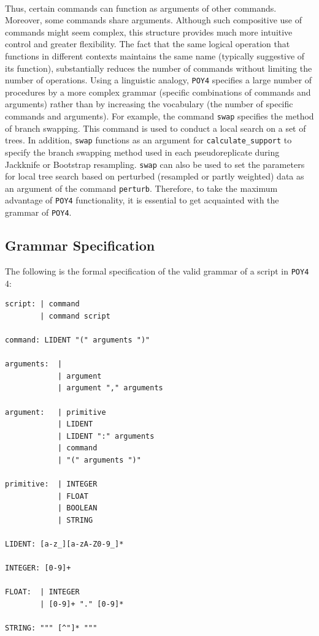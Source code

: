 \documentclass[11pt]{book}
\newcommand{\commandstyle}[1]{\texttt{#1}}
\newcommand{\poycommand}[1]{\commandstyle{#1}}
\newcommand{\poy}{\commandstyle{POY4}\xspace}
\begin{document}
\paragraph{}Thus, certain commands can function as arguments of other commands. Moreover,
some commands share arguments. Although such compositive use of commands
might seem complex, this structure provides much more intuitive
control and greater flexibility. The fact that the same logical operation that functions
in different contexts maintains
the same name (typically suggestive of its function), substantially reduces the number of
commands without limiting the number of operations. Using a linguistic analogy,
\poy specifies a large number of procedures by a more complex grammar (specific
combinations of commands and arguments) rather than by increasing the vocabulary
(the number of specific commands and arguments). For example, the command
\poycommand{swap} specifies the method of branch swapping. This command is
used to conduct a local search on a set of trees. In addition,
\poycommand{swap} functions as an argument for \poycommand{calculate\_support}
to specify the branch swapping method used in each pseudoreplicate during Jackknife or
Bootstrap resampling. \poycommand{swap} can also be used to set the parameters for
local tree search based on perturbed (resampled or partly weighted) data as an argument
of the command \poycommand{perturb}. Therefore, to take the maximum advantage of
\poy functionality, it is essential to get acquainted with the grammar of  \poy.

\subsection{Grammar Specification}

The following is the formal specification of the valid grammar of a script in \poy 4:

\begin{verbatim}
script: | command
        | command script

command: LIDENT "(" arguments ")"

arguments:  |
            | argument
            | argument "," arguments

argument:   | primitive
            | LIDENT
            | LIDENT ":" arguments
            | command
            | "(" arguments ")"

primitive:  | INTEGER
            | FLOAT
            | BOOLEAN
            | STRING

LIDENT: [a-z_][a-zA-Z0-9_]*

INTEGER: [0-9]+

FLOAT:  | INTEGER
        | [0-9]+ "." [0-9]*

STRING: """ [^"]* """

\end{verbatim}
\end{document}
